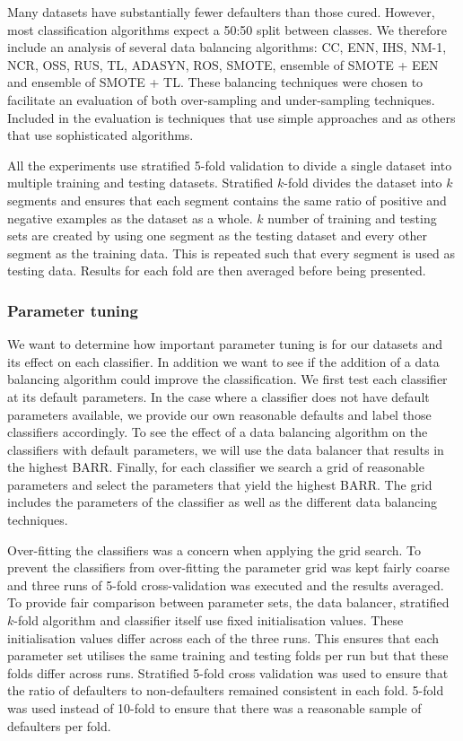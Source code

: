 \documentclass{sig-alternate-05-2015}
\begin{document}
	Many datasets have substantially fewer defaulters than those cured. However, most classification algorithms expect a 50:50 split between classes. We therefore include an analysis of several data balancing algorithms: CC, ENN, IHS, NM-1, NCR, OSS, RUS, TL, ADASYN, ROS, SMOTE, ensemble of SMOTE + EEN and ensemble of SMOTE + TL. These balancing techniques were chosen to facilitate an evaluation of both over-sampling and under-sampling techniques. Included in the evaluation is techniques that use simple approaches and as others that use sophisticated algorithms.
	
	All the experiments use stratified 5-fold validation to divide a single dataset into multiple training and testing datasets. Stratified $k$-fold divides the dataset into $k$ segments and ensures that each segment contains the same ratio of positive and negative examples as the dataset as a whole. $k$ number of training and testing sets are created by using one segment as the testing dataset and every other segment as the training data. This is repeated such that every segment is used as testing data. Results for each fold are then averaged before being presented.
	
	\subsubsection{Parameter tuning}
	\label{parameter_tuning}
	We want to determine how important parameter tuning is for our datasets and its effect on each classifier. In addition we want to see if the addition of a data balancing algorithm could improve the classification. We first test each classifier at its default parameters. In the case where a classifier does not have default parameters available, we provide our own reasonable defaults and label those classifiers accordingly. To see the effect of a data balancing algorithm on the classifiers with default parameters, we will use the data balancer that results in the highest BARR. Finally, for each classifier we search a grid of reasonable parameters and select the parameters that yield the highest BARR. The grid includes the parameters of the classifier as well as the different data balancing techniques.
	
	Over-fitting the classifiers was a concern when applying the grid search. To prevent the classifiers from over-fitting the parameter grid was kept fairly coarse and three runs of 5-fold cross-validation was executed and the results averaged. To provide fair comparison between parameter sets, the data balancer, stratified $k$-fold algorithm and classifier itself use fixed initialisation values. These initialisation values differ across each of the three runs. This ensures that each parameter set utilises the same training and testing folds per run but that these folds differ across runs. Stratified 5-fold cross validation was used to ensure that the ratio of defaulters to non-defaulters remained consistent in each fold. 5-fold was used instead of 10-fold to ensure that there was a reasonable sample of defaulters per fold.
	
\end{document}
